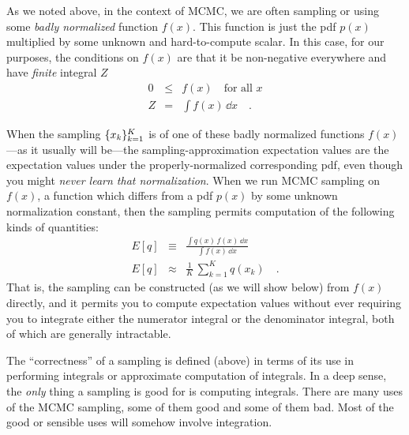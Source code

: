 \documentclass[12pt,twoside,pdftex]{article}
\begin{document}
As we noted above, in the context of MCMC, we are often sampling or
using some \emph{badly normalized} function $f(x)$.
This function is just the pdf $p(x)$ multiplied by some unknown and
hard-to-compute scalar.
In this case, for our purposes, the conditions on $f(x)$ are that it
be non-negative everywhere and have \emph{finite} integral $Z$
\begin{eqnarray}
0 &\leq& f(x) \quad \mbox{for all $x$}
\\
Z &=& \int f(x)\,\dd x
\quad .
\end{eqnarray}

When the sampling $\{{x_k}\}_{k=1}^K$ is of one of these badly
normalized functions $f(x)$---as it usually will be---the
sampling-approximation expectation values are the expectation values
under the properly-normalized corresponding pdf, even though you might
\emph{never learn that normalization}.
When we run MCMC sampling on $f(x)$, a function which differs from a
pdf $p(x)$ by some unknown normalization constant, then the sampling
permits computation of the following kinds of quantities:
\begin{eqnarray}
E[q] &\equiv& \frac{\int q(x)\,f(x)\,\dd x}{\int f(x)\,\dd x}
\\
E[q] &\approx& \frac{1}{K}\,\sum_{k=1}^K q(x_k)
\quad .
\end{eqnarray}
That is, the sampling can be constructed (as we will show below) from
$f(x)$ directly, and it permits you to compute expectation values
without ever requiring you to integrate either the numerator integral
or the denominator integral, both of which are generally
intractable.

The ``correctness'' of a sampling is defined (above) in terms of its use in
  performing integrals or approximate computation of integrals.
In a deep sense, the \emph{only} thing a sampling is good for is
  computing integrals.
There are many uses of the MCMC sampling, some of them good and some of them bad.
Most of the good or sensible uses will somehow involve integration.

\end{document}

